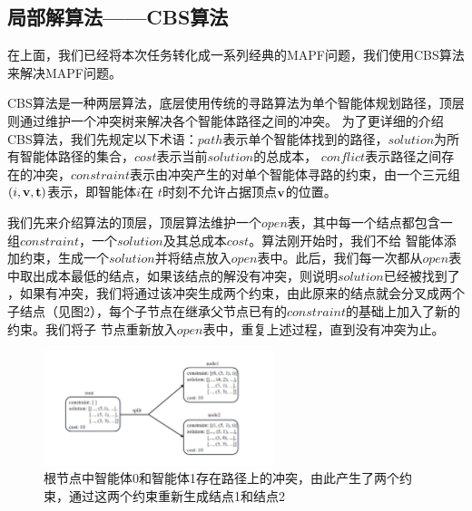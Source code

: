 \documentclass[UTF8]{ctexart}  %
\begin{document}
\subsection{局部解算法——CBS算法}
在上面，我们已经将本次任务转化成一系列经典的MAPF问题，我们使用CBS算法来解决MAPF问题。

CBS算法是一种两层算法，底层使用传统的寻路算法为单个智能体规划路径，顶层则通过维护一个冲突树来解决各个智能体路径之间的冲突。
为了更详细的介绍CBS算法，我们先规定以下术语：$path$表示单个智能体找到的路径，$solution$为所有智能体路径的集合，$cost$表示当前$solution$的总成本，
$conflict$表示路径之间存在的冲突，$constraint$表示由冲突产生的对单个智能体寻路的约束，由一个三元组$( i, \bf v, t)$表示，即智能体$i$在
$t$时刻不允许占据顶点$\bf v$的位置。

我们先来介绍算法的顶层，顶层算法维护一个$open$表，其中每一个结点都包含一组$constraint$，一个$solution$及其总成本$cost$。算法刚开始时，我们不给
智能体添加约束，生成一个$solution$并将结点放入$open$表中。此后，我们每一次都从$open$表中取出成本最低的结点，如果该结点的解没有冲突，则说明$solution$已经被找到了
，如果有冲突，我们将通过该冲突生成两个约束，由此原来的结点就会分叉成两个子结点（见图2），每个子节点在继承父节点已有的$constraint$的基础上加入了新的约束。我们将子
节点重新放入$open$表中，重复上述过程，直到没有冲突为止。

\begin{figure}[H]
    \centering
    \centering
    \includegraphics[width=0.6\textwidth, keepaspectratio]{fig3.png}
    \captionsetup{font=footnotesize}
    \caption{根节点中智能体0和智能体1存在路径上的冲突，由此产生了两个约束，通过这两个约束重新生成结点1和结点2}
    \label{figure1}
\end{figure}
\end{document}
